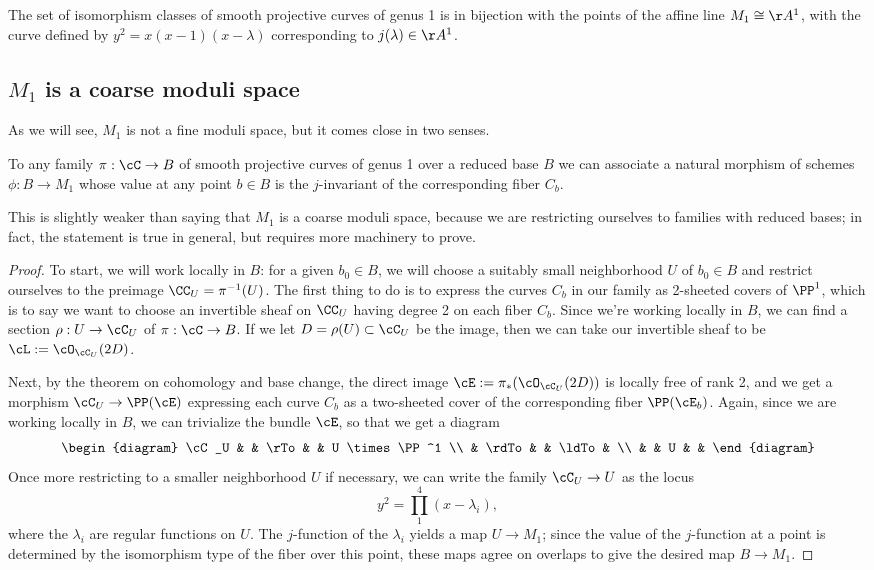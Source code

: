 \begin{theorem}
The set of isomorphism classes of smooth projective curves of genus 1 is in bijection with the points of the affine line $M_1 \cong \AA^1$, with the curve defined by $y^2 = x(x-1)(x-\lambda)$
corresponding to $j(\lambda)\in \AA^1$.
\end{theorem}

\subsection{$M_1$ is a coarse moduli space}

 As we will see,
$M_1$ is not a fine moduli space, but it comes close in two senses. 

\begin{proposition}\label{M1 is coarse}
To any family $\pi : \cC \to B$  of smooth projective curves of genus 1 over a reduced base $B$ we can associate a natural morphism of schemes $\phi : B \to M_1$ whose value at any point $b \in B$ is the $j$-invariant of the corresponding fiber $C_b$.
\end{proposition} 

This is slightly weaker than saying that $M_1$ is a coarse moduli space, because we are restricting ourselves to families with reduced bases; in fact, the statement is true in general, but requires more machinery to prove.

\begin{proof}
To start, we will work locally in $B$: for a given $b_0 \in B$, we will choose a suitably small neighborhood $U$ of $b_0 \in B$ and restrict ourselves to the preimage $\CC_U = \pi^{-1}(U)$. The first thing to do is to express the curves $C_b$ in our family as 2-sheeted covers of $\PP^1$, which is to say we want to choose an invertible sheaf on $\CC_U$ having degree 2 on each fiber $C_b$. Since we're working locally in $B$,
we can find a section $\rho : U \to \cC_U$ of $\pi : \cC \to B$. If we let $D = \rho(U) \subset \cC_U$ be the image, then we can take our invertible sheaf to be $\cL := \cO_{\cC_U}(2D)$.

Next, by the theorem on cohomology and base change, the direct image $\cE := \pi_*(\cO_{\cC_U}(2D))$ is locally free of rank 2, and we get a morphism $\cC_U \to \PP(\cE)$ expressing each curve $C_b$ as a two-sheeted cover of the corresponding fiber $\PP(\cE_b)$. Again, since we are working locally in $B$, we can trivialize the bundle $\cE$, so that we get a diagram
$$
\begin{diagram}
\cC_U & & \rTo & & U \times \PP^1 \\
& \rdTo & & \ldTo & \\
& & U & &
\end{diagram} 
$$
Once more restricting to a smaller neighborhood $U$ if necessary, we can write the family $\cC_U \to U$ as the locus
$$
y^2 = \prod_1^4 (x - \lambda_i),
$$
where the $\lambda_i$ are regular functions on $U$. The $j$-function of the $\lambda_i$  yields a map $U \to M_1$; since the value of the $j$-function at a point is determined by the isomorphism type of the fiber over this point, these maps agree on overlaps to give  the desired map $B \to M_1$.
\end{proof}


